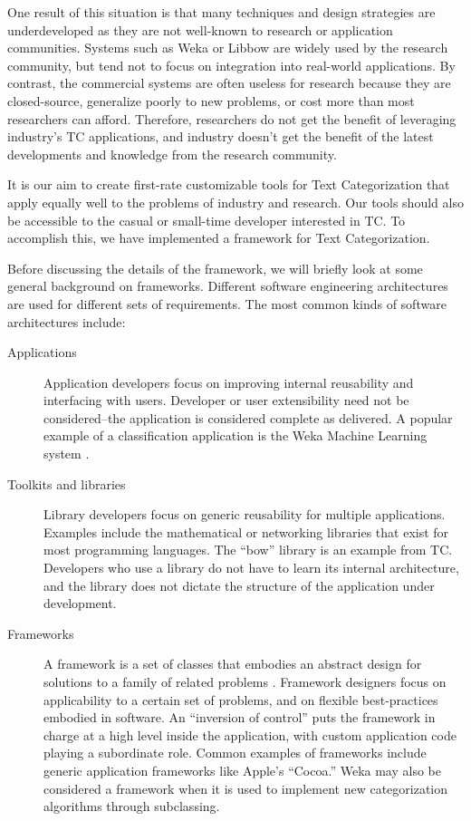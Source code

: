 \documentclass[twocolumn]{article}
\begin{document}
One result of this situation is that many techniques and
design strategies are underdeveloped as they are not well-known to research or
application communities.  Systems such as Weka \cite{weka:99} or
Libbow \cite{bow:96} are widely used by the research community, but
tend not to focus on integration into real-world applications.  By
contrast, the commercial systems are often useless for research
because they are closed-source, generalize poorly to new problems, or
cost more than most researchers can afford.  Therefore, researchers do
not get the benefit of leveraging industry's TC
applications, and industry doesn't get the benefit of the latest
developments and knowledge from the research community.

It is our aim to create first-rate customizable tools for Text
Categorization that apply equally well to the problems of industry and
research.  Our tools should also be accessible to the casual or
small-time developer interested in TC.  To accomplish this, we have
implemented a framework for Text Categorization.

Before discussing the details of the framework, we will briefly look at some general
background on frameworks.  Different software engineering
architectures are used for different sets of requirements.  The most
common kinds of software architectures include:


\begin{description}
\item[Applications] Application developers focus on improving internal
reusability and interfacing with users.  Developer or user
extensibility need not be considered--the application is considered
complete as delivered.  A popular example of a classification
application is the Weka Machine Learning system \cite{weka:99}.

\item[Toolkits and libraries] Library developers focus on generic
reusability for multiple applications.  Examples include the
mathematical or networking libraries that exist for most programming
languages.  The ``bow'' library \cite{bow:96} is an example from TC.
Developers who use a library do not have to learn its internal
architecture, and the library does not dictate the structure of the
application under development.  \cite{fayad:99}

\item[Frameworks] A framework is a set of classes that embodies an
abstract design for solutions to a family of related problems
\cite[Ch. 2]{fayad:99}.  Framework designers focus on applicability to
a certain set of problems, and on flexible best-practices embodied in
software.  An ``inversion of control'' puts the framework in charge at
a high level inside the application, with custom application code
playing a subordinate role.  Common examples of frameworks include
generic application frameworks like Apple's ``Cocoa.''  Weka may also
be considered a framework when it is used to implement new
categorization algorithms through subclassing.
\end{description}
\end{document}
